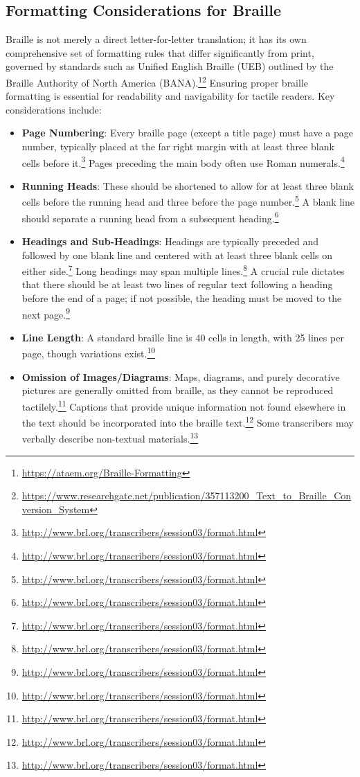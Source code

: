 \subsection{Formatting Considerations for Braille}
Braille is not merely a direct letter-for-letter translation; it has its own comprehensive set of formatting rules that differ significantly from print, governed by standards such as Unified English Braille (UEB) outlined by the Braille Authority of North America (BANA).\footnote{\url{https://ataem.org/Braille-Formatting}}\footnote{\url{https://www.researchgate.net/publication/357113200_Text_to_Braille_Conversion_System}} Ensuring proper braille formatting is essential for readability and navigability for tactile readers. Key considerations include:
\begin{itemize}[noitemsep,topsep=0pt]
    \item \textbf{Page Numbering}: Every braille page (except a title page) must have a page number, typically placed at the far right margin with at least three blank cells before it.\footnote{\url{http://www.brl.org/transcribers/session03/format.html}} Pages preceding the main body often use Roman numerals.\footnote{\url{http://www.brl.org/transcribers/session03/format.html}}
    \item \textbf{Running Heads}: These should be shortened to allow for at least three blank cells before the running head and three before the page number.\footnote{\url{http://www.brl.org/transcribers/session03/format.html}} A blank line should separate a running head from a subsequent heading.\footnote{\url{http://www.brl.org/transcribers/session03/format.html}}
    \item \textbf{Headings and Sub-Headings}: Headings are typically preceded and followed by one blank line and centered with at least three blank cells on either side.\footnote{\url{http://www.brl.org/transcribers/session03/format.html}} Long headings may span multiple lines.\footnote{\url{http://www.brl.org/transcribers/session03/format.html}} A crucial rule dictates that there should be at least two lines of regular text following a heading before the end of a page; if not possible, the heading must be moved to the next page.\footnote{\url{http://www.brl.org/transcribers/session03/format.html}}
    \item \textbf{Line Length}: A standard braille line is 40 cells in length, with 25 lines per page, though variations exist.\footnote{\url{http://www.brl.org/transcribers/session03/format.html}}
    \item \textbf{Omission of Images/Diagrams}: Maps, diagrams, and purely decorative pictures are generally omitted from braille, as they cannot be reproduced tactilely.\footnote{\url{http://www.brl.org/transcribers/session03/format.html}} Captions that provide unique information not found elsewhere in the text should be incorporated into the braille text.\footnote{\url{http://www.brl.org/transcribers/session03/format.html}} Some transcribers may verbally describe non-textual materials.\footnote{\url{http://www.brl.org/transcribers/session03/format.html}}

\end{itemize}
